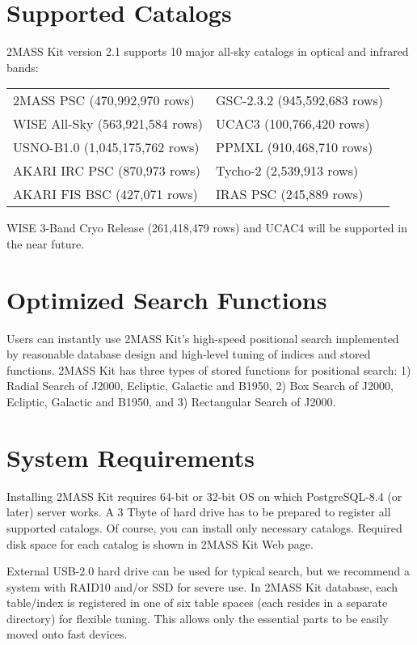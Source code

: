\documentclass[11pt,twoside]{article}
\begin{document}
\section{Supported Catalogs}

2MASS Kit version 2.1 supports 10 major all-sky catalogs
in optical and infrared bands:
\begin{center}
\begin{tabular}{ll}
\hline
 2MASS PSC (470,992,970 rows)    &        GSC-2.3.2 (945,592,683 rows) \\
 WISE All-Sky (563,921,584 rows) &       UCAC3 (100,766,420 rows) \\
 USNO-B1.0 (1,045,175,762 rows) &       PPMXL (910,468,710 rows) \\
 AKARI IRC PSC (870,973 rows)    &       Tycho-2 (2,539,913 rows) \\
 AKARI FIS BSC (427,071 rows)    &       IRAS PSC (245,889 rows) \\
\hline
\end{tabular}
\end{center}
WISE 3-Band Cryo Release (261,418,479 rows) and UCAC4
will be supported in the near future.


\section{Optimized Search Functions}

Users can instantly use 2MASS Kit's high-speed positional search
implemented by reasonable database design and high-level tuning of 
indices and stored functions.
2MASS Kit has three types of stored functions for
positional search:
1) Radial Search of J2000, Ecliptic, Galactic and B1950,
2) Box Search of J2000, Ecliptic, Galactic and B1950, and
3) Rectangular Search of J2000.


\section{System Requirements}

Installing 2MASS Kit requires
64-bit or 32-bit OS on which PostgreSQL-8.4 (or later) server works.
A 3 Tbyte of hard drive has to be prepared to register all supported catalogs.
Of course, you can install only necessary catalogs.
Required disk space for each catalog is shown in 2MASS Kit Web page.

External USB-2.0 hard drive can be used for typical search,
but we recommend a system with RAID10 and/or SSD for severe use.
In 2MASS Kit database, each table/index is registered in one of six
table spaces (each resides in a separate directory)
for flexible tuning. 
This allows only the essential parts to be easily moved onto fast devices.
\end{document}
